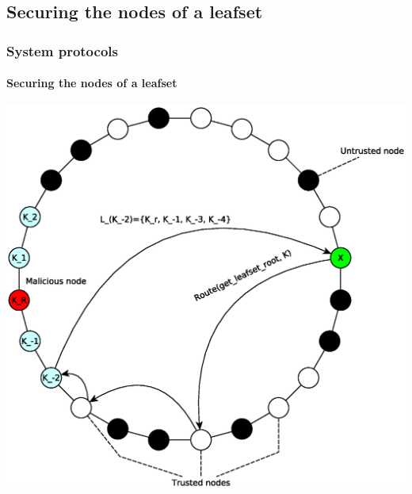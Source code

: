\subsection{Securing the nodes of a leafset}
\begin{frame}
\frametitle{System protocols}
\framesubtitle{Securing the nodes of a leafset}
\includegraphics[height=0.7\textheight]{../../img/secure_routing}\\
\end{frame}

